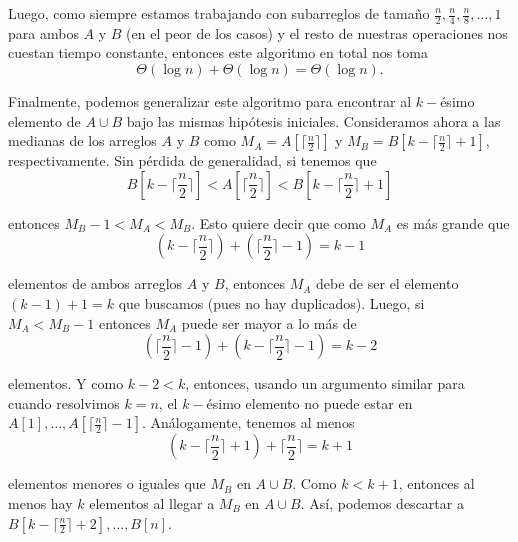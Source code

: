 \documentclass[letterpaper,11pt]{article}
\begin{document}
\begin{enumerate}
    Luego, como siempre estamos trabajando con subarreglos de tamaño 
    $\frac{n}{2}, \frac{n}{4}, \frac{n}{8}, \ldots, 1$ para ambos $A$ y $B$
    (en el peor de los casos) y el resto de nuestras operaciones nos cuestan 
    tiempo constante, entonces este algoritmo en total nos toma 
    \begin{equation*}
        \Theta(\log n) + \Theta(\log n) = \Theta(\log n). 
    \end{equation*}

    Finalmente, podemos generalizar este algoritmo para encontrar al $k-$ésimo 
    elemento de $A \cup B$ bajo las mismas hipótesis iniciales. Consideramos 
    ahora a las medianas de los arreglos $A$ y $B$ como $M_A = 
    A[\lceil \frac{n}{2} \rceil]$ y $M_B = B[k - \lceil \frac{n}{2} \rceil + 1]$,
    respectivamente. Sin pérdida de generalidad, si tenemos que
    \begin{equation*}
        B[k - \lceil \frac{n}{2} \rceil] < 
        A[\lceil \frac{n}{2} \rceil] < 
        B[k - \lceil \frac{n}{2} \rceil + 1]
    \end{equation*}

    entonces $M_B - 1 < M_A < M_B$. Esto quiere decir que como $M_A$ es más 
    grande que
    \begin{equation*}
        (k - \lceil \frac{n}{2} \rceil) + (\lceil \frac{n}{2} \rceil - 1) = k-1
    \end{equation*} 
    
    elementos de ambos arreglos $A$ y $B$, entonces $M_A$ debe de ser el 
    elemento $(k-1)+1 = k$ que buscamos (pues no hay duplicados). Luego, si 
    $M_A < M_B - 1$ entonces $M_A$ puede ser mayor a lo más de
    \begin{equation*}
        (\lceil \frac{n}{2} \rceil - 1) + 
        (k - \lceil \frac{n}{2} \rceil - 1) = k-2
    \end{equation*} 
    
    elementos. Y como $k-2 < k$, entonces, usando un argumento similar para 
    cuando resolvimos $k=n$, el $k-$ésimo elemento no puede estar en 
    $A[1], \ldots, A[\lceil \frac{n}{2} \rceil - 1]$. Análogamente, tenemos 
    al menos
    \begin{equation*}
        (k - \lceil \frac{n}{2} \rceil + 1) + \lceil \frac{n}{2} \rceil = k+1
    \end{equation*}

    elementos menores o iguales que $M_B$ en $A \cup B$. Como $k < k+1$, 
    entonces al menos hay $k$ elementos al llegar a $M_B$ en $A \cup B$. 
    Así, podemos descartar a $B[k - \lceil \frac{n}{2} \rceil + 2], \ldots,
    B[n]$. 


\end{enumerate}
\end{document}

